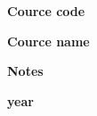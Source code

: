 \pagestyle{empty}
\clearpage
\begin{center}

\vfill
\vspace*{4cm}
\Huge{\bfseries Cource code}

\vspace{8mm}
\Huge{\bfseries Cource name}

\vspace{8mm}
\Huge{\bfseries Notes}

\vspace{8mm}
\Huge{\bfseries year}

\vfill
\end{center}
